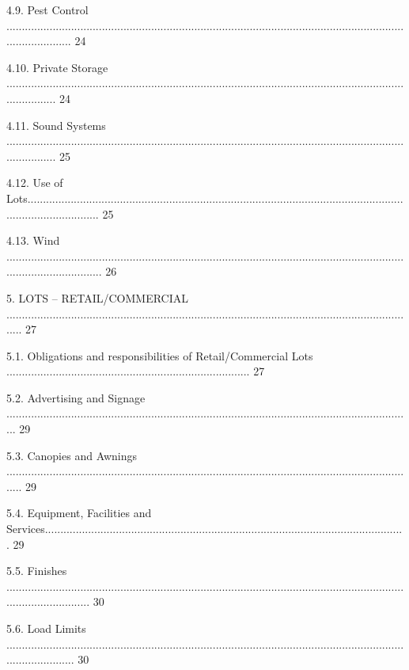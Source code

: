 \documentclass{article}
\begin{document}
{\fontsize{9.99}{1}4.9. Pest Control ...................................................................................................................................................... 24 }

{\fontsize{9.99}{1}4.10. Private Storage ................................................................................................................................................. 24 }

{\fontsize{9.99}{1}4.11. Sound Systems ................................................................................................................................................. 25 }

{\fontsize{9.99}{1}4.12. Use of Lots........................................................................................................................................................ 25 }

{\fontsize{9.99}{1}4.13. Wind ................................................................................................................................................................ 26 }

{\fontsize{9.99}{1}5. LOTS – RETAIL/COMMERCIAL ...................................................................................................................................... 27 }

{\fontsize{9.99}{1}5.1. Obligations and responsibilities of Retail/Commercial Lots ............................................................................... 27 }

{\fontsize{9.99}{1}5.2. Advertising and Signage .................................................................................................................................... 29 }

{\fontsize{9.99}{1}5.3. Canopies and Awnings ...................................................................................................................................... 29 }

{\fontsize{9.99}{1}5.4. Equipment, Facilities and Services..................................................................................................................... 29 }

{\fontsize{9.99}{1}5.5. Finishes ............................................................................................................................................................ 30 }

{\fontsize{9.99}{1}5.6. Load Limits ....................................................................................................................................................... 30 }
\end{document}

